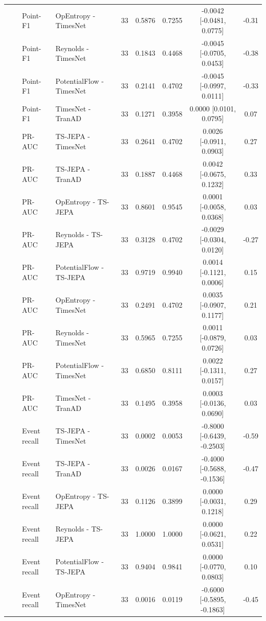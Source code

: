 {\begin{longtable}{@{}llllccccc@{}}
 &  & Point-F1 & OpEntropy - TimesNet & 33 & 0.5876 & 0.7255 & -0.0042 [-0.0481, 0.0775] & -0.31 \\
 &  & Point-F1 & Reynolds - TimesNet & 33 & 0.1843 & 0.4468 & -0.0045 [-0.0705, 0.0453] & -0.38 \\
 &  & Point-F1 & PotentialFlow - TimesNet & 33 & 0.2141 & 0.4702 & -0.0045 [-0.0997, 0.0111] & -0.33 \\
 &  & Point-F1 & TimesNet - TranAD & 33 & 0.1271 & 0.3958 & 0.0000 [0.0101, 0.0795] & 0.07 \\
 &  & PR-AUC & TS-JEPA - TimesNet & 33 & 0.2641 & 0.4702 & 0.0026 [-0.0911, 0.0903] & 0.27 \\
 &  & PR-AUC & TS-JEPA - TranAD & 33 & 0.1887 & 0.4468 & 0.0042 [-0.0675, 0.1232] & 0.33 \\
 &  & PR-AUC & OpEntropy - TS-JEPA & 33 & 0.8601 & 0.9545 & 0.0001 [-0.0058, 0.0368] & 0.03 \\
 &  & PR-AUC & Reynolds - TS-JEPA & 33 & 0.3128 & 0.4702 & -0.0029 [-0.0304, 0.0120] & -0.27 \\
 &  & PR-AUC & PotentialFlow - TS-JEPA & 33 & 0.9719 & 0.9940 & 0.0014 [-0.1121, 0.0006] & 0.15 \\
 &  & PR-AUC & OpEntropy - TimesNet & 33 & 0.2491 & 0.4702 & 0.0035 [-0.0907, 0.1177] & 0.21 \\
 &  & PR-AUC & Reynolds - TimesNet & 33 & 0.5965 & 0.7255 & 0.0011 [-0.0879, 0.0726] & 0.03 \\
 &  & PR-AUC & PotentialFlow - TimesNet & 33 & 0.6850 & 0.8111 & 0.0022 [-0.1311, 0.0157] & 0.27 \\
 &  & PR-AUC & TimesNet - TranAD & 33 & 0.1495 & 0.3958 & 0.0003 [-0.0136, 0.0690] & 0.03 \\
 &  & Event recall & TS-JEPA - TimesNet & 33 & 0.0002 & 0.0053 & -0.8000 [-0.6439, -0.2503] & -0.59 \\
 &  & Event recall & TS-JEPA - TranAD & 33 & 0.0026 & 0.0167 & -0.4000 [-0.5688, -0.1536] & -0.47 \\
 &  & Event recall & OpEntropy - TS-JEPA & 33 & 0.1126 & 0.3899 & 0.0000 [-0.0031, 0.1218] & 0.29 \\
 &  & Event recall & Reynolds - TS-JEPA & 33 & 1.0000 & 1.0000 & 0.0000 [-0.0621, 0.0531] & 0.22 \\
 &  & Event recall & PotentialFlow - TS-JEPA & 33 & 0.9404 & 0.9841 & 0.0000 [-0.0770, 0.0803] & 0.10 \\
 &  & Event recall & OpEntropy - TimesNet & 33 & 0.0016 & 0.0119 & -0.6000 [-0.5895, -0.1863] & -0.45 \\

\end{longtable}}
